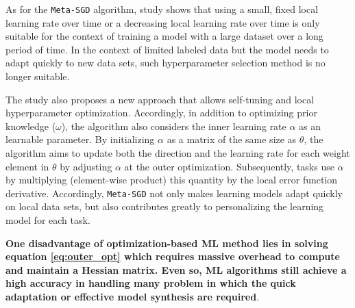 As for the \verb|Meta-SGD| algorithm, study \cite{li2017meta} shows that using a small, fixed local learning rate over time or a decreasing local learning rate over time is only suitable for the context of training a model with a large dataset over a long period of time. In the context of limited labeled data but the model needs to adapt quickly to new data sets, such hyperparameter selection method is no longer suitable.


The \cite{li2017meta} study also proposes a new approach that allows self-tuning and local hyperparameter optimization. Accordingly, in addition to optimizing prior knowledge ($\omega$), the algorithm also considers the inner learning rate $\alpha$ as an learnable parameter. By initializing $\alpha$ as a matrix of the same size as $\theta$, the algorithm aims to update both the direction and the learning rate for each weight element in $\theta$ by adjusting $\alpha$ at the outer optimization. Subsequently, tasks use $\alpha$ by multiplying (element-wise product) this quantity by the local error function derivative. Accordingly, \verb|Meta-SGD| not only makes learning models adapt quickly on local data sets, but also contributes greatly to personalizing the learning model for each task.

\textbf{One disadvantage of optimization-based ML method lies in solving equation \ref{eq:outer_opt} which requires massive overhead to compute and maintain a Hessian matrix. Even so, ML algorithms still achieve a high accuracy in handling many problem in which the quick adaptation or effective model synthesis are required}.
